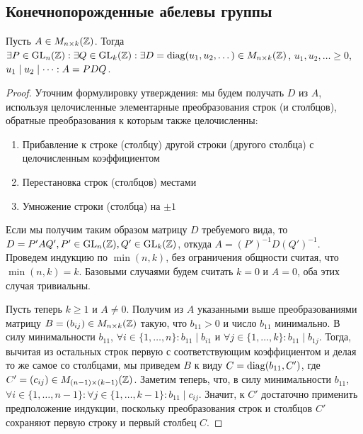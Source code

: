 \subsection{Конечнопорожденные абелевы группы}

\begin{proposition}
	Пусть $A \in M_{n \times k}(\mathbb{Z})$. Тогда $\exists P \hm\in \GL_n(\Z): \exists Q \in \GL_k(\Z): \exists D \hm=\diag(u_1, u_2, \dotsc) \hm\in M_{n \times k}(\Z)$, $u_1, u_2, \dotsc \ge 0$, $u_1 \mid u_2 \mid \dotsb : A \hm= PDQ$.
\end{proposition}

\begin{proof}
	Уточним формулировку утверждения: мы будем получать $D$ из $A$, используя целочисленные элементарные преобразования строк (и столбцов), обратные преобразования к которым также целочисленны:
	\begin{enumerate}
		\item Прибавление к строке (столбцу) другой строки (другого столбца) с целочисленным коэффициентом
		\item Перестановка строк (столбцов) местами
		\item Умножение строки (столбца) на $\pm1$
	\end{enumerate}
	
	Если мы получим таким образом матрицу $D$ требуемого вида, то $D = P'AQ', P' \hm\in \GL_n(\Z),  Q' \in \GL_k(\Z)$, откуда $A = (P')^{-1}D(Q')^{-1}$. Проведем индукцию по $\min(n, k)$, без ограничения общности считая, что $\min(n, k) = k$. Базовыми случаями будем считать $k = 0$ и $A = 0$, оба этих случая тривиальны.
	
	Пусть теперь $k \ge 1$ и $A \ne 0$. Получим из $A$ указанными выше преобразованиями матрицу $B = (b_{ij}) \in M_{n \times k}(\mathbb{Z})$ такую, что $b_{11} > 0$ и число $b_{11}$ минимально. В силу минимальности $b_{11}$, $\forall i \in \{1, \dotsc, n\}: b_{11} \mid b_{i1}$ и $\forall j \in \{1, \dotsc, k\}: b_{11} \mid b_{1j}$. Тогда, вычитая из остальных строк первую с соответствующим коэффициентом и делая то же самое со столбцами, мы приведем $B$ к виду $C = \operatorname{diag}(b_{11}, C')$, где $C' = (c_{ij}) \in M_{(n - 1) \times (k - 1)}(\mathbb{Z})$. Заметим теперь, что, в силу минимальности $b_{11}$, $\forall i \in \{1, \dotsc, n - 1\}: \forall j \in \{1, \dots, k - 1\}: b_{11} \mid c_{ij}$. Значит, к $C'$ достаточно применить предположение индукции, поскольку преобразования строк и столбцов $C'$ сохраняют первую строку и первый столбец $C$.
\end{proof}


